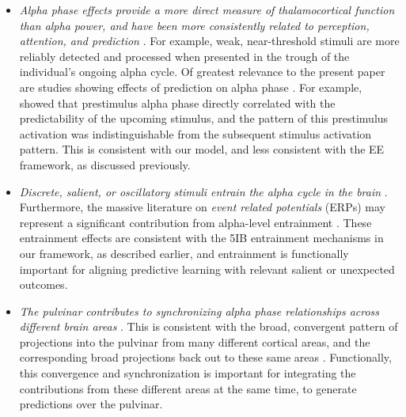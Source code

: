 \documentclass[11pt,twoside]{article}
\newif\myifpdf
\begin{document}
\begin{itemize}
	\item \emph{Alpha phase effects provide a more direct measure of thalamocortical function than alpha power, and have been more consistently related to perception, attention, and prediction}  \citep{NunnOsselton74,VarelaToroJohnEtAl81,VanRullenKoch03,BuschDuboisVanRullen09,MathewsonFabianiGrattonEtAl10,PalvaPalva11,JaegleRo13,Solis-VivancoJensenBonnefond18}.  For example, weak, near-threshold stimuli are more reliably detected and processed when presented in the trough of the individual's ongoing alpha cycle.  Of greatest relevance to the present paper are studies showing effects of prediction on alpha phase \citep{SamahaBauerCimaroliEtAl15,MayerSchwiedrzikWibralEtAl16,ShermanKanaiSethEtAl16}.  For example, \citet{MayerSchwiedrzikWibralEtAl16} showed that prestimulus alpha phase directly correlated with the predictability of the upcoming stimulus, and the pattern of this prestimulus activation was indistinguishable from the subsequent stimulus activation pattern.  This is consistent with our model, and less consistent with the EE framework, as discussed previously.

	\item \emph{Discrete, salient, or oscillatory stimuli entrain the alpha cycle in the brain} \citep{SpaakLangeJensen14,MathewsonPrudhommeFabianiEtAl12}.  Furthermore, the massive literature on \emph{event related potentials} (ERPs) may represent a significant contribution from alpha-level entrainment \citep{MakeigWesterfieldJungEtAl02,GruberKlimeschSausengEtAl05,Klimesch11}.  These entrainment effects are consistent with the 5IB entrainment mechanisms in our framework, as described earlier, and entrainment is functionally important for aligning predictive learning with relevant salient or unexpected outcomes.

	\item \emph{The pulvinar contributes to synchronizing alpha phase relationships across different brain areas} \citep{SaalmannPinskWangEtAl12,FiebelkornPinskKastner18}.  This is consistent with the broad, convergent pattern of projections into the pulvinar from many different cortical areas, and the corresponding broad projections back out to these same areas \citep{Shipp03,ArcaroPinskKastner15}.  Functionally, this convergence and synchronization is important for integrating the contributions from these different areas at the same time, to generate predictions over the pulvinar.
	

\end{itemize}
\end{document}
